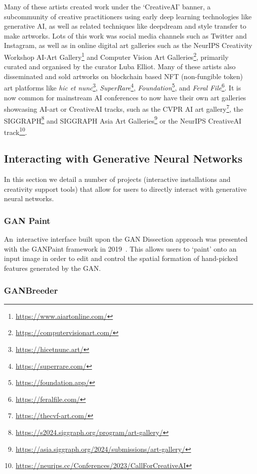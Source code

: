 Many of these artists created work under the `CreativeAI' banner, a subcommunity of creative practitioners using early deep learning technologies like generative AI, as well as related techniques like deepdream and style transfer \citep{gatys2016neural} to make artworks. 
Lots of this work was social media channels such as Twitter and Instagram, as well as in online digital art galleries such as the NeurIPS Creativity Workshop AI-Art Gallery\footnote{\url{https://www.aiartonline.com/}} and Computer Vision Art Galleries\footnote{\url{https://computervisionart.com/}}, primarily curated and organised by the curator Luba Elliot. 
Many of these artists also disseminated and sold artworks on blockchain based NFT (non-fungible token) art platforms like \textit{hic et nunc}\footnote{\url{https://hicetnunc.art/}}, \textit{SuperRare}\footnote{\url{https://superrare.com/}}, \textit{Foundation}\footnote{\url{https://foundation.app/}}, and \textit{Feral File}\footnote{\url{https://feralfile.com/}}. 
It is now common for mainstream AI conferences to now have their own art galleries showcasing AI-art or CreativeAI tracks, such as the CVPR AI art gallery\footnote{\url{https://thecvf-art.com/}}, the SIGGRAPH\footnote{\url{https://s2024.siggraph.org/program/art-gallery/}} and SIGGRAPH Asia Art Galleries\footnote{\url{https://asia.siggraph.org/2024/submissions/art-gallery/}} or the NeurIPS CreativeAI track\footnote{\url{https://neurips.cc/Conferences/2023/CallForCreativeAI}}.

\subsection{Interacting with Generative Neural Networks} 

In this section we detail a number of projects (interactive installations and creativity support tools) that allow for users to directly interact with generative neural networks.

\subsubsection{GAN Paint}

An~interactive interface built upon the GAN Dissection approach \citep{Bau2018-td} was presented with the GANPaint framework in 2019~\citep{bau2019semantic}. 
This allows users to `paint' onto an input image in order to edit and control the spatial formation of hand-picked features generated by the GAN. 

\subsubsection{GANBreeder}

